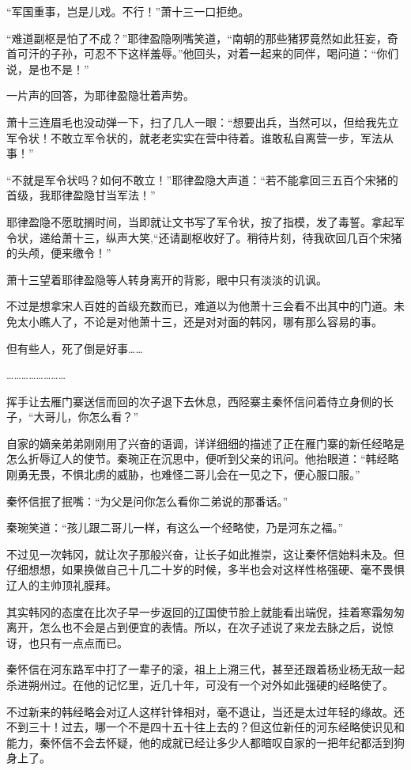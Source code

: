 “军国重事，岂是儿戏。不行！”萧十三一口拒绝。

“难道副枢是怕了不成？”耶律盈隐咧嘴笑道，“南朝的那些猪猡竟然如此狂妄，奇首可汗的子孙，可忍不下这样羞辱。”他回头，对着一起来的同伴，喝问道：“你们说，是也不是！”

一片声的回答，为耶律盈隐壮着声势。

萧十三连眉毛也没动弹一下，扫了几人一眼：“想要出兵，当然可以，但给我先立军令状！不敢立军令状的，就老老实实在营中待着。谁敢私自离营一步，军法从事！”

“不就是军令状吗？如何不敢立！”耶律盈隐大声道：“若不能拿回三五百个宋猪的首级，我耶律盈隐甘当军法！”

耶律盈隐不愿耽搁时间，当即就让文书写了军令状，按了指模，发了毒誓。拿起军令状，递给萧十三，纵声大笑,“还请副枢收好了。稍待片刻，待我砍回几百个宋猪的头颅，便来缴令！”

萧十三望着耶律盈隐等人转身离开的背影，眼中只有淡淡的讥讽。

不过是想拿宋人百姓的首级充数而已，难道以为他萧十三会看不出其中的门道。未免太小瞧人了，不论是对他萧十三，还是对对面的韩冈，哪有那么容易的事。

但有些人，死了倒是好事……

……………………

挥手让去雁门寨送信而回的次子退下去休息，西陉寨主秦怀信问着侍立身侧的长子，“大哥儿，你怎么看？”

自家的嫡亲弟弟刚刚用了兴奋的语调，详详细细的描述了正在雁门寨的新任经略是怎么折辱辽人的使节。秦琬正在沉思中，便听到父亲的讯问。他抬眼道：“韩经略刚勇无畏，不惧北虏的威胁，也难怪二哥儿会在一见之下，便心服口服。”

秦怀信抿了抿嘴：“为父是问你怎么看你二弟说的那番话。”

秦琬笑道：“孩儿跟二哥儿一样，有这么一个经略使，乃是河东之福。”

不过见一次韩冈，就让次子那般兴奋，让长子如此推崇，这让秦怀信始料未及。但仔细想想，如果换做自己十几二十岁的时候，多半也会对这样性格强硬、毫不畏惧辽人的主帅顶礼膜拜。

其实韩冈的态度在比次子早一步返回的辽国使节脸上就能看出端倪，挂着寒霜匆匆离开，怎么也不会是占到便宜的表情。所以，在次子述说了来龙去脉之后，说惊讶，也只有一点点而已。

秦怀信在河东路军中打了一辈子的滚，祖上上溯三代，甚至还跟着杨业杨无敌一起杀进朔州过。在他的记忆里，近几十年，可没有一个对外如此强硬的经略使了。

不过新来的韩经略会对辽人这样针锋相对，毫不退让，当还是太过年轻的缘故。还不到三十！过去，哪一个不是四十五十往上去的？但这位新任的河东经略使识见和能力，秦怀信不会去怀疑，他的成就已经让多少人都暗叹自家的一把年纪都活到狗身上了。

